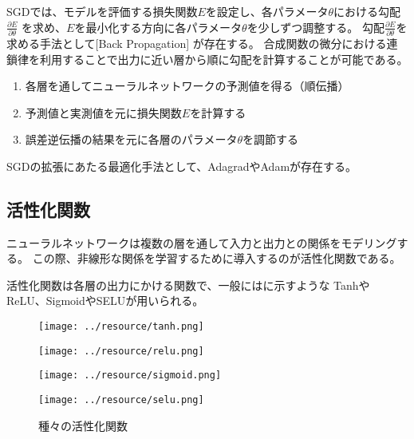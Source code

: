 SGDでは、モデルを評価する損失関数$E$を設定し、各パラメータ$\theta$における勾配$\frac{\partial E}{\partial \theta}$
を求め、$E$を最小化する方向に各パラメータ$\theta$を少しずつ調整する。
勾配$\frac{\partial E}{\partial \theta}$を求める手法として[Back Propagation] \cite{backpropagation}が存在する。
合成関数の微分における連鎖律を利用することで出力に近い層から順に勾配を計算することが可能である。
\begin{enumerate}
    \item 各層を通してニューラルネットワークの予測値を得る（順伝播）
    \item 予測値と実測値を元に損失関数$E$を計算する
    \item 誤差逆伝播の結果を元に各層のパラメータ$\theta$を調節する
\end{enumerate}

SGDの拡張にあたる最適化手法として、Adagrad\cite{adagrad}やAdam\cite{adam}が存在する。

\subsection{活性化関数}

ニューラルネットワークは複数の層を通して入力と出力との関係をモデリングする。
この際、非線形な関係を学習するために導入するのが活性化関数である。

活性化関数は各層の出力にかける関数で、一般にはに示すような
TanhやReLU\cite{relu}、Sigmoid\cite{sigmoid}やSELU\cite{selu}が用いられる。
\begin{figure}[tbp]
    \begin{minipage}[h]{0.49\hsize}
    \centering
    \texttt{[image: ../resource/tanh.png]} 
     \label{fig:tanh}
    \end{minipage}
    \begin{minipage}[h]{0.49\hsize}    
    \centering
    \texttt{[image: ../resource/relu.png]}
     \label{fig:relu}
    \end{minipage}
    \begin{minipage}[h]{0.49\hsize}
    \centering
    \texttt{[image: ../resource/sigmoid.png]} 
     \label{fig:sigmoid}
    \end{minipage}
    \begin{minipage}[h]{0.49\hsize}
    \centering
    \texttt{[image: ../resource/selu.png]}
     \label{fig:selu}
    \end{minipage}
\caption{種々の活性化関数} \label{fig:activation_function}
\end{figure}

